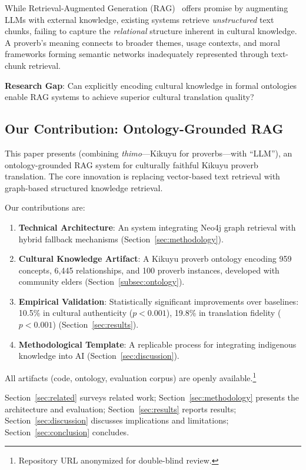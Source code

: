 While Retrieval-Augmented Generation (RAG)~\cite{lewis2020retrieval} offers promise by augmenting LLMs with external knowledge, existing systems retrieve \emph{unstructured} text chunks, failing to capture the \emph{relational} structure inherent in cultural knowledge. A proverb's meaning connects to broader themes, usage contexts, and moral frameworks forming semantic networks inadequately represented through text-chunk retrieval.

\textbf{Research Gap}: Can explicitly encoding cultural knowledge in formal ontologies enable RAG systems to achieve superior cultural translation quality?

\subsection{Our Contribution: Ontology-Grounded RAG}
\label{subsec:contribution}

This paper presents \thillmo{} (combining \emph{thimo}---Kikuyu for proverbs---with ``LLM''), an ontology-grounded RAG system for culturally faithful Kikuyu proverb translation. The core innovation is replacing vector-based text retrieval with graph-based structured knowledge retrieval.

Our contributions are:

\begin{enumerate}
    \item \textbf{Technical Architecture}: An \ograg{} system integrating Neo4j graph retrieval with hybrid fallback mechanisms (Section~\ref{sec:methodology}).
    
    \item \textbf{Cultural Knowledge Artifact}: A Kikuyu proverb ontology encoding 959 concepts, 6,445 relationships, and 100 proverb instances, developed with community elders (Section~\ref{subsec:ontology}).
    
    \item \textbf{Empirical Validation}: Statistically significant improvements over baselines: 10.5\% in cultural authenticity ($p<0.001$), 19.8\% in translation fidelity ($p<0.001$) (Section~\ref{sec:results}).
    
    \item \textbf{Methodological Template}: A replicable process for integrating indigenous knowledge into AI (Section~\ref{sec:discussion}).
\end{enumerate}

All artifacts (code, ontology, evaluation corpus) are openly available.\footnote{Repository URL anonymized for double-blind review.}

Section~\ref{sec:related} surveys related work; Section~\ref{sec:methodology} presents the \ograg{} architecture and evaluation; Section~\ref{sec:results} reports results; Section~\ref{sec:discussion} discusses implications and limitations; Section~\ref{sec:conclusion} concludes.
